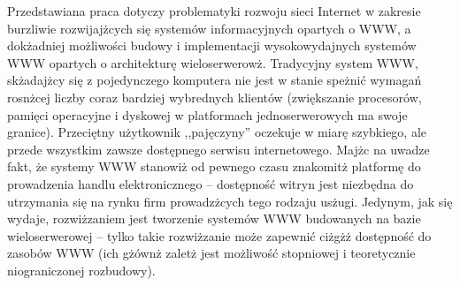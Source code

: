 Przedstawiana praca dotyczy problematyki rozwoju sieci Internet w zakresie burzliwie rozwijajżcych się systemów
informacyjnych opartych o WWW, a dokżadniej możliwości budowy i implementacji wysokowydajnych systemów WWW opartych
o architekturę wieloserwerowż. Tradycyjny system WWW, skżadajżcy się z pojedynczego komputera nie jest w stanie speżnić
wymagań rosnżcej liczby coraz bardziej wybrednych klientów (zwiększanie procesorów, pamięci operacyjne i dyskowej w platformach
jednoserwerowych ma swoje granice). Przeciętny użytkownik ,,pajęczyny'' oczekuje w miarę
szybkiego,
ale przede wszystkim zawsze dostępnego serwisu internetowego. Majżc na uwadze fakt, że systemy WWW stanowiż od pewnego czasu
znakomitż platformę do prowadzenia handlu elektronicznego -- dostępność witryn jest niezbędna do utrzymania się na rynku firm
prowadzżcych tego rodzaju usżugi. Jedynym, jak się wydaje, rozwiżzaniem jest tworzenie systemów WWW budowanych
na bazie wieloserwerowej -- tylko takie rozwiżzanie może zapewnić ciżgżż dostępność do zasobów WWW (ich gżównż zaletż
jest możliwość stopniowej i teoretycznie niograniczonej rozbudowy).

